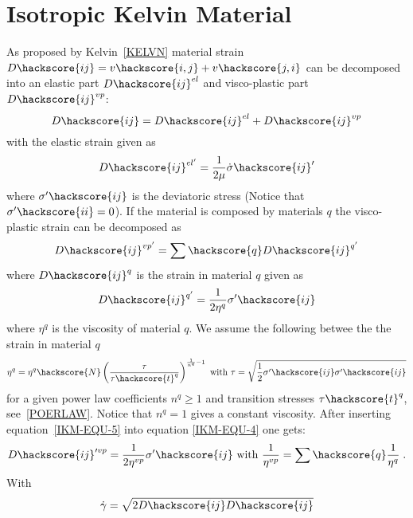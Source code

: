 \section{Isotropic Kelvin Material \label{IKM}}
As proposed by Kelvin~\ref{KELVN} material strain $D\hackscore{ij}=v\hackscore{i,j}+v\hackscore{j,i}$ can be decomposed into
an elastic part $D\hackscore{ij}^{el}$ and visco-plastic part $D\hackscore{ij}^{vp}$:
\begin{equation}\label{IKM-EQU-2}
D\hackscore{ij}=D\hackscore{ij}^{el}+D\hackscore{ij}^{vp}
\end{equation}
with the elastic strain given as 
\begin{equation}\label{IKM-EQU-3}
D\hackscore{ij}^{el'}=\frac{1}{2 \mu} \dot{\sigma}\hackscore{ij}'
\end{equation}
where $\sigma'\hackscore{ij}$ is the deviatoric stress (Notice that $\sigma'\hackscore{ii}=0$).
If the material is composed by materials $q$ the visco-plastic strain can be decomposed as
\begin{equation}\label{IKM-EQU-4}
D\hackscore{ij}^{vp'}=\sum\hackscore{q} D\hackscore{ij}^{q'} 
\end{equation}
where $D\hackscore{ij}^{q}$ is the strain in material $q$ given as 
\begin{equation}\label{IKM-EQU-5}
D\hackscore{ij}^{q'}=\frac{1}{2 \eta^{q}} \sigma'\hackscore{ij} 
\end{equation}
where $\eta^{q}$ is the viscosity of material $q$. We assume the following 
betwee the the strain in material $q$ 
\begin{equation}\label{IKM-EQU-5b}
\eta^{q}=\eta^{q}\hackscore{N} \left(\frac{\tau}{\tau\hackscore{t}^q}\right)^{\frac{1}{n^{q}}-1}
\mbox{ with } \tau=\sqrt{\frac{1}{2}\sigma'\hackscore{ij} \sigma'\hackscore{ij}}
\end{equation}
for a given power law coefficients $n^{q}\ge1$ and transition stresses $\tau\hackscore{t}^q$, see~\ref{POERLAW}.
Notice that $n^{q}=1$ gives a constant viscosity.
After inserting equation~\ref{IKM-EQU-5} into equation \ref{IKM-EQU-4} one gets:
\begin{equation}\label{IKM-EQU-6}
D\hackscore{ij}'^{vp}=\frac{1}{2 \eta^{vp}} \sigma'\hackscore{ij} \mbox{ with } \frac{1}{\eta^{vp}} = \sum\hackscore{q} \frac{1}{\eta^{q}} \;.
\end{equation}
With
\begin{equation}\label{IKM-EQU-8}
\dot{\gamma}=\sqrt{2 D\hackscore{ij} D\hackscore{ij}}
\end{equation}
